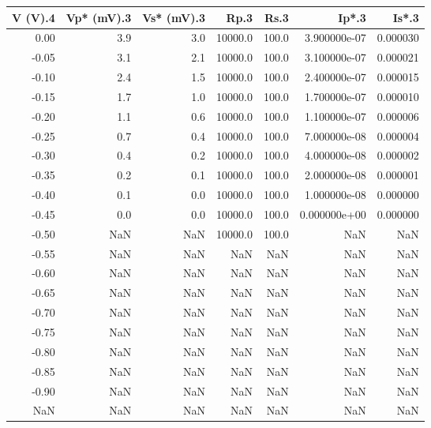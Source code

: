 \begin{tabular}{rrrrrrr}
\toprule
 V (V).4 &  Vp* (mV).3 &  Vs* (mV).3 &    Rp.3 &  Rs.3 &        Ip*.3 &    Is*.3 \\
\midrule
    0.00 &         3.9 &         3.0 & 10000.0 & 100.0 & 3.900000e-07 & 0.000030 \\
   -0.05 &         3.1 &         2.1 & 10000.0 & 100.0 & 3.100000e-07 & 0.000021 \\
   -0.10 &         2.4 &         1.5 & 10000.0 & 100.0 & 2.400000e-07 & 0.000015 \\
   -0.15 &         1.7 &         1.0 & 10000.0 & 100.0 & 1.700000e-07 & 0.000010 \\
   -0.20 &         1.1 &         0.6 & 10000.0 & 100.0 & 1.100000e-07 & 0.000006 \\
   -0.25 &         0.7 &         0.4 & 10000.0 & 100.0 & 7.000000e-08 & 0.000004 \\
   -0.30 &         0.4 &         0.2 & 10000.0 & 100.0 & 4.000000e-08 & 0.000002 \\
   -0.35 &         0.2 &         0.1 & 10000.0 & 100.0 & 2.000000e-08 & 0.000001 \\
   -0.40 &         0.1 &         0.0 & 10000.0 & 100.0 & 1.000000e-08 & 0.000000 \\
   -0.45 &         0.0 &         0.0 & 10000.0 & 100.0 & 0.000000e+00 & 0.000000 \\
   -0.50 &         NaN &         NaN & 10000.0 & 100.0 &          NaN &      NaN \\
   -0.55 &         NaN &         NaN &     NaN &   NaN &          NaN &      NaN \\
   -0.60 &         NaN &         NaN &     NaN &   NaN &          NaN &      NaN \\
   -0.65 &         NaN &         NaN &     NaN &   NaN &          NaN &      NaN \\
   -0.70 &         NaN &         NaN &     NaN &   NaN &          NaN &      NaN \\
   -0.75 &         NaN &         NaN &     NaN &   NaN &          NaN &      NaN \\
   -0.80 &         NaN &         NaN &     NaN &   NaN &          NaN &      NaN \\
   -0.85 &         NaN &         NaN &     NaN &   NaN &          NaN &      NaN \\
   -0.90 &         NaN &         NaN &     NaN &   NaN &          NaN &      NaN \\
     NaN &         NaN &         NaN &     NaN &   NaN &          NaN &      NaN \\

\end{tabular}

